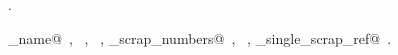 \documentclass{report}
\begin{document}
\begin{flushleft}
\begin{minipage}{\linewidth}
\begin{list}{}{}
\mbox{}\verb@}@{\NWsep}
\end{list}
\vspace{-1ex}
\footnotesize\addtolength{\baselineskip}{-1ex}
\begin{list}{}{\setlength{\itemsep}{-\parsep}\setlength{\itemindent}{-\leftmargin}}
\item \NWtxtMacroRefIn\ .
\end{list}
\vspace{-2ex}
\footnotesize\addtolength{\baselineskip}{-1ex}
\begin{list}{}{\setlength{\itemsep}{-\parsep}\setlength{\itemindent}{-\leftmargin}}
\item \NWtxtIdentsUsed\nobreak\  \verb@command_name@\nobreak\ , \verb@fprintf@\nobreak\ , \verb@fputs@\nobreak\ , \verb@print_scrap_numbers@\nobreak\ , \verb@stderr@\nobreak\ , \verb@write_single_scrap_ref@\nobreak\ .\end{list}
\end{minipage}\\[4ex]
\end{flushleft}
\end{document}
